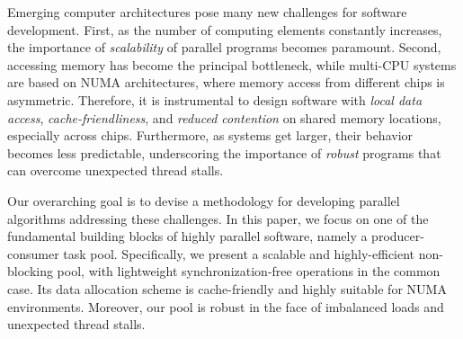 %

Emerging computer architectures pose many new challenges for software
development. First, as the number of computing elements constantly
increases, the importance of \emph{scalability} of parallel programs
becomes paramount. Second, accessing memory has become the principal
bottleneck, while multi-CPU systems are based on NUMA architectures,
where memory access from different chips is asymmetric.
Therefore, it is instrumental to design software with
\emph{local data access}, \emph{cache-friendliness}, and
\emph{reduced contention} on shared memory locations, especially
across chips. Furthermore, as systems get larger, their behavior
becomes less predictable, underscoring the importance of \emph{robust}
programs that can overcome unexpected thread stalls.

Our overarching goal is to devise a methodology for developing
parallel algorithms addressing these challenges. In this paper,
we focus on one of the fundamental building blocks of highly parallel software, namely a producer-consumer task pool. Specifically, we
present a scalable and highly-efficient non-blocking pool, with
lightweight synchronization-free operations in the common case. Its
data allocation scheme is cache-friendly and highly suitable for NUMA
environments. Moreover, our pool is robust in the face of imbalanced
loads and unexpected thread stalls.

